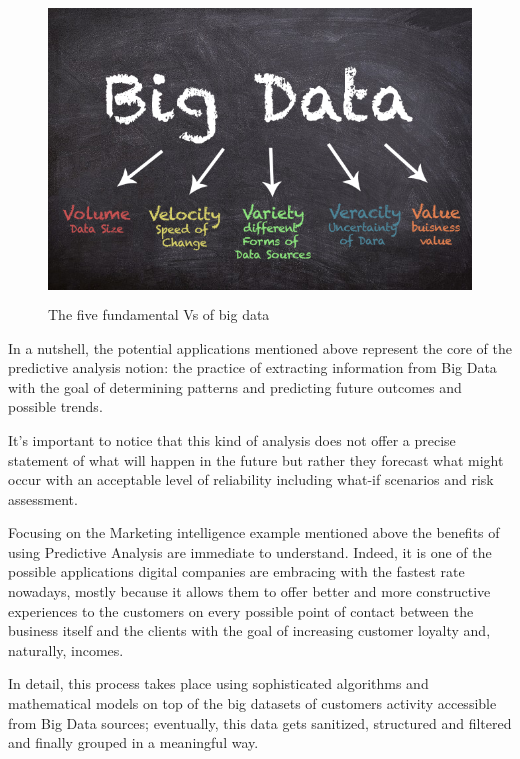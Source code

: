\vspace{0.5cm}
\begin{figure}[htbp]
  \centering
    \includegraphics[height=8cm]{images/bigdata.png}
  \caption{The five fundamental Vs of big data }
  \label{fig:bigdata}
\end{figure}
\vspace{0.5cm}

In a nutshell, the potential applications mentioned above represent the core of the predictive analysis notion: the practice of extracting information from Big Data with the goal of determining patterns and predicting future outcomes and possible trends. 

It's important to notice that this kind of analysis does not offer a precise statement of what will happen in the future but rather they forecast what might occur with an acceptable level of reliability including what-if scenarios and risk assessment.

Focusing on the Marketing intelligence example mentioned above the benefits of using Predictive Analysis are immediate to understand. Indeed, it is one of the possible applications digital companies are embracing with the fastest rate nowadays, mostly because it allows them to offer better and more constructive experiences to the customers on every possible point of contact between the business itself and the clients with the goal of increasing customer loyalty and, naturally, incomes.


In detail, this process takes place using sophisticated algorithms and mathematical models on top of the big datasets of customers activity accessible from Big Data sources; eventually, this data gets sanitized, structured and filtered and finally grouped in a meaningful way. 

